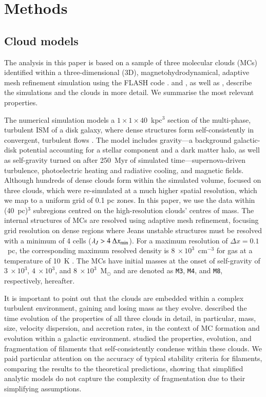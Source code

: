 \section{Methods}\label{methods}


\subsection{Cloud models}\label{methods:clouds}

The analysis in this paper is based on a sample of three molecular clouds (MCs) identified within a three-dimensional (3D), magnetohydrodynamical, adaptive mesh refinement simulation using the FLASH code \citep{Fryxell2000}.  
 and , as well as \citet[ hereafter]{Chira2018}, describe the simulations and the clouds in more detail. 
We summarise the most relevant properties. 

The numerical simulation models a $1\times1\times40$~kpc$^3$ section of the multi-phase, turbulent ISM of a disk galaxy, where dense structures form self-consistently in convergent, turbulent flows .  
The model includes gravity---a background galactic-disk potential accounting for a stellar component and a dark matter halo, as well as self-gravity turned on after 250~Myr of simulated time---supernova-driven turbulence, photoelectric heating and radiative cooling, and magnetic fields. 
Although hundreds of dense clouds form within the simulated volume,  focused on three clouds, which were re-simulated at a much higher spatial resolution, which we map to a uniform grid of 0.1 pc zones.
In this paper, we use the data within (40~pc)$^{3}$ subregions centred on the high-resolution clouds' centres of mass.
The internal structures of MCs are resolved using adaptive mesh refinement, focusing grid resolution on dense regions where Jeans unstable structures must be resolved with a minimum of 4 cells ($\lambda_J > 4~\Delta x_{\rm min}$).
For a maximum resolution of $\Delta x = 0.1$~pc, the corresponding maximum resolved density is $8~\times 10^3$~cm$^{-3}$ for gas at a temperature of 10~K .
The MCs have initial masses at the onset of self-gravity of $3~\times 10^3$, $4~\times 10^3$, and $8~\times 10^3$~M$_{\odot}$ and are denoted as \texttt{M3}, \texttt{M4}, and \texttt{M8}, respectively, hereafter.

It is important to point out that the clouds are embedded within a complex turbulent environment, gaining and losing mass as they evolve.
 described the time evolution of the properties of all three clouds in detail, in particular, mass, size, velocity dispersion, and accretion rates, in the context of MC formation and evolution within a galactic environment.
 studied the properties, evolution, and fragmentation of filaments that self-consistently condense within these clouds. 
We paid particular attention on the accuracy of typical stability criteria for filaments, comparing the results to the theoretical predictions, showing that simplified analytic models do not capture the complexity of fragmentation due to their simplifying assumptions.


